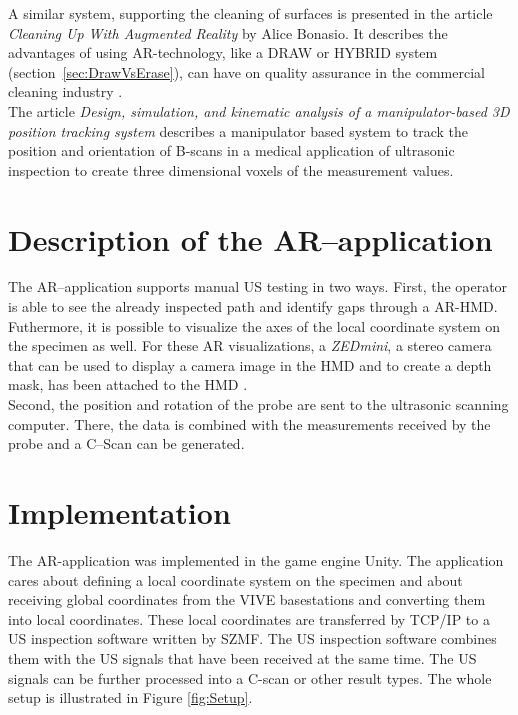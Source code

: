\documentclass{VRARWorkshop}
\begin{document}
A similar system, supporting the cleaning of surfaces is presented in the article \textit{Cleaning Up With Augmented Reality} by Alice Bonasio.
It describes the advantages of using AR-technology, like a DRAW or HYBRID system (section~\ref{sec:DrawVsErase}), can have on quality assurance in the commercial cleaning industry \cite{ARClean}.\\

The article \textit{Design, simulation, and kinematic analysis of a manipulator-based 3D position tracking system} describes a manipulator based system to track the position and orientation of B-scans in a medical application of ultrasonic inspection to create three dimensional voxels of the measurement values.
\cite{fadzil_design_2015}\\


\section{Description of the AR--application}
The AR--application supports manual US testing in two ways. First, 
the operator is able to see the already inspected path and identify gaps through a AR-HMD. 
Futhermore, it is possible to visualize the axes of the local coordinate system on the specimen as well.
For these AR visualizations, a \textit{ZEDmini}, a stereo camera that can be used to display a camera image in the HMD and to create a depth mask, has been attached to the HMD \cite{dorner_virtual_2013}. \\
Second, the position and rotation of the probe are sent to the ultrasonic scanning computer.
There, the data is combined with the measurements received by the probe and a C--Scan can be 
generated.

\section{Implementation}
The AR-application was implemented in the game engine Unity. The application cares about defining a local coordinate 
system on the specimen and about receiving 
global coordinates from the VIVE basestations 
and converting them into local coordinates.
These local coordinates are transferred by TCP/IP to a US inspection software written by SZMF.
The US inspection software combines them with the US signals that have been received
at the same time. The US signals can be further processed into a C-scan or other result types.
The whole setup is illustrated in Figure \ref{fig:Setup}. \\
\end{document}
